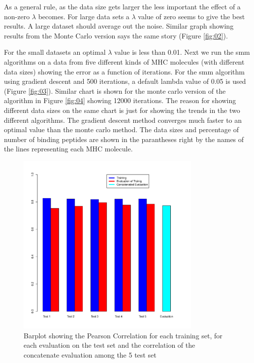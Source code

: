 \documentclass{bioinfo}
\begin{document}
\begin{application}
\par As a general rule, as the data size gets larger the less important the effect of a non-zero $\lambda$ becomes. For large data sets a $\lambda$ value of zero seems to give the best results. A large dataset should average out the noise. Similar graph showing results from the Monte Carlo version says the same story (Figure \ref{fig:02}).
\par For the small datasets an optimal $\lambda$ value is  less than 0.01. Next we run the smm algorithms on a data from five different kinds of MHC molecules (with different data sizes) showing the error as a function of iterations. For the smm algorithm using gradient descent and 500 iterations, a default lambda value of 0.05 is used (Figure \ref{fig:03}). Similar chart is shown for the monte carlo version of the algorithm in Figure \ref{fig:04} showing 12000 iterations. The reason for showing different data sizes on the same chart is just for showing the trends in the two different algorithms. The gradient descent method converges much faster to an optimal value than the monte carlo method. The data sizes and percentage of number of binding peptides are shown in the parantheses right by the names of the lines representing each MHC molecule.

\begin{figure}[!tpb]
\centerline{\includegraphics[width=9cm]{fig/barplot.pdf}}
\caption{Barplot showing the Pearson Correlation for each training set, for each evaluation on the test set and the correlation of the concatenate evaluation among the 5 test set}
\label{fig:05}
\end{figure}


\end{application}
\end{document}
